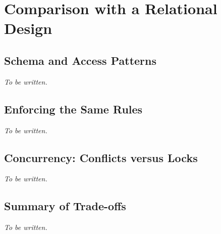 
\section{Comparison with a Relational Design}\label{sec:relational}

\subsection{Schema and Access Patterns}

\textit{To be written.}

\subsection{Enforcing the Same Rules}

\textit{To be written.}

\subsection{Concurrency: Conflicts versus Locks}

\textit{To be written.}

\subsection{Summary of Trade-offs}

\textit{To be written.}
